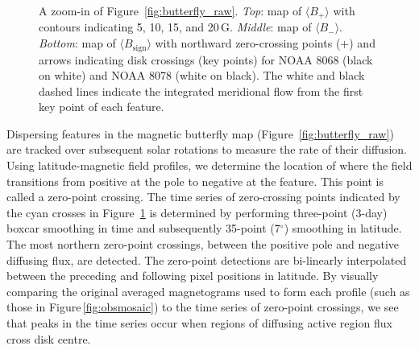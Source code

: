\begin{figure}[!t]    %
\caption[A zoom-in of Figure~\ref{fig:butterfly_raw}.]{A zoom-in of Figure~\ref{fig:butterfly_raw}. \emph{Top}: map of $\langle B_{+} \rangle$ with contours indicating 5, 10, 15, and 20\,G. \emph{Middle}: map of $\langle B_{-} \rangle$. \emph{Bottom}: map of $\langle B_{\mathrm{sign}} \rangle$ with northward zero-crossing points ($+$) and arrows indicating disk crossings (key points) for NOAA 8068 (black on white) and NOAA 8078 (white on black). The white and black dashed lines indicate the integrated meridional flow from the first key point of each feature.
}
   \label{fig:butterfly_zoom}
   \end{figure}

Dispersing features in the magnetic butterfly map (Figure~\ref{fig:butterfly_raw}) are tracked over subsequent solar rotations to measure the rate of their diffusion. Using latitude-magnetic field profiles, we determine the location of where the field transitions from positive at the pole to negative at the feature. This point is called a zero-point crossing.
The time series of zero-crossing points indicated by the cyan crosses in Figure~\ref{fig:butterfly_zoom} is determined by performing three-point (3-day) boxcar smoothing in time and subsequently 35-point (7$^\circ$) smoothing in latitude. The most northern zero-point crossings, between the positive pole and negative diffusing flux, are detected. The zero-point detections are bi-linearly interpolated between the preceding and following pixel positions in latitude. By visually comparing the original averaged magnetograms used to form each profile (such as those in Figure\,\ref{fig:obsmosaic}) to the time series of zero-point crossings, we see that peaks in the time series occur when regions of diffusing active region flux cross disk centre. 

